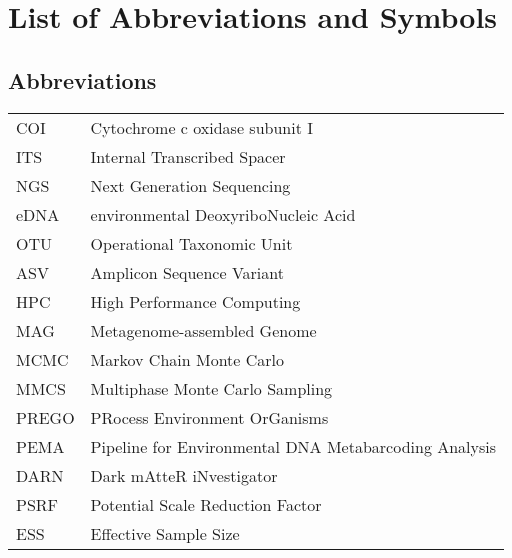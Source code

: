 \documentclass[master=elt, cleveref, autoref, masteroption=eg]{kulemt}
\begin{document}
\listoffiguresandtables

\chapter{List of Abbreviations and Symbols}

\section*{Abbreviations}
   \begin{flushleft}
   \renewcommand{\arraystretch}{1.1}
   \begin{tabularx}{\textwidth}{@{}p{12mm}X@{}}
      COI   & Cytochrome c oxidase subunit I\\
      ITS   & Internal Transcribed Spacer\\
      NGS   & Next Generation Sequencing\\
      eDNA  & environmental DeoxyriboNucleic Acid\\
      OTU   & Operational Taxonomic Unit\\
      ASV   & Amplicon Sequence Variant\\
      HPC   & High Performance Computing\\
      MAG   & Metagenome-assembled Genome\\
      MCMC  & Markov Chain Monte Carlo\\
      MMCS  & Multiphase Monte Carlo Sampling\\
      PREGO & PRocess Environment OrGanisms\\
      PEMA  & Pipeline for Environmental DNA Metabarcoding Analysis\\
      DARN  & Dark mAtteR iNvestigator\\
      PSRF  & Potential Scale Reduction Factor\\
      ESS   & Effective Sample Size\\
   \end{tabularx}
\end{flushleft}


\end{document}
